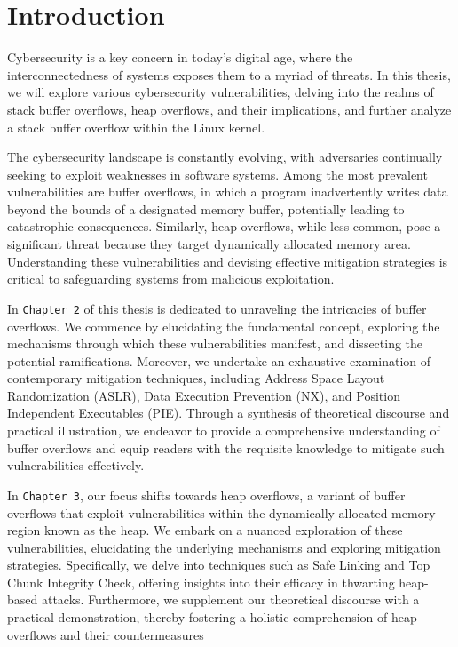   \chapter{Introduction}
    Cybersecurity is a key concern in today's digital age, where the interconnectedness of systems exposes them to a myriad of threats.\newline
    In this thesis, we will explore various cybersecurity vulnerabilities, delving into the realms of stack buffer overflows, heap overflows, and their implications, and further analyze a stack buffer overflow within the Linux kernel.\newline

    The cybersecurity landscape is constantly evolving, with adversaries continually seeking to exploit weaknesses in software systems.\newline
    Among the most prevalent vulnerabilities are buffer overflows, in which a program inadvertently writes data beyond the bounds of a designated memory buffer, potentially leading to catastrophic consequences.\newline
    Similarly, heap overflows, while less common, pose a significant threat because they target dynamically allocated memory area. Understanding these vulnerabilities and devising effective mitigation strategies is critical to safeguarding systems from malicious exploitation.

    In \texttt{Chapter 2} of this thesis is dedicated to unraveling the intricacies of buffer overflows. We commence by elucidating the fundamental concept, exploring the mechanisms through which these vulnerabilities manifest, and dissecting the potential ramifications. Moreover, we undertake an exhaustive examination of contemporary mitigation techniques, including Address Space Layout Randomization (ASLR), Data Execution Prevention (NX), and Position Independent Executables (PIE). Through a synthesis of theoretical discourse and practical illustration, we endeavor to provide a comprehensive understanding of buffer overflows and equip readers with the requisite knowledge to mitigate such vulnerabilities effectively.

    In \texttt{Chapter 3}, our focus shifts towards heap overflows, a variant of buffer overflows that exploit vulnerabilities within the dynamically allocated memory region known as the heap. We embark on a nuanced exploration of these vulnerabilities, elucidating the underlying mechanisms and exploring mitigation strategies. Specifically, we delve into techniques such as Safe Linking and Top Chunk Integrity Check, offering insights into their efficacy in thwarting heap-based attacks. Furthermore, we supplement our theoretical discourse with a practical demonstration, thereby fostering a holistic comprehension of heap overflows and their countermeasures


